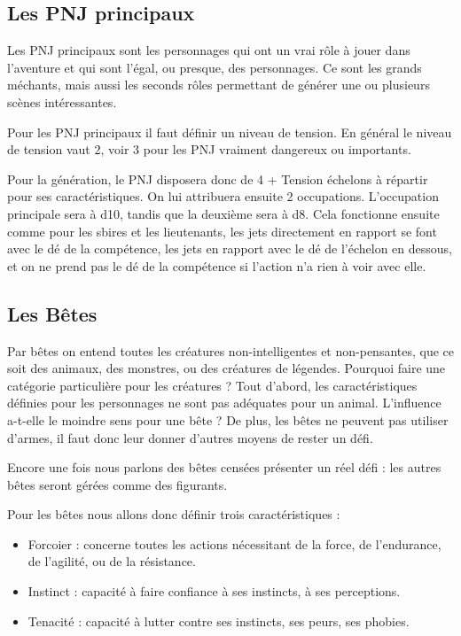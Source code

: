 \subsection{Les PNJ principaux}

Les PNJ principaux sont les personnages qui ont un vrai rôle à jouer dans l'aventure et qui sont l'égal, ou presque, des personnages. Ce sont les grands méchants, mais aussi les seconds rôles permettant de générer une ou plusieurs scènes intéressantes.

Pour les PNJ principaux il faut définir un niveau de tension. En général le niveau de tension vaut 2, voir 3 pour les PNJ vraiment dangereux ou importants. 

Pour la génération, le PNJ disposera donc de 4 + Tension échelons à répartir pour ses caractéristiques. On lui attribuera ensuite 2 occupations. L'occupation principale sera à d10, tandis que la deuxième sera à d8. Cela fonctionne ensuite comme pour les sbires et les lieutenants, les jets directement en rapport se font avec le dé de la compétence, les jets en rapport avec le dé de l'échelon en dessous, et on ne prend pas le dé de la compétence si l'action n'a rien à voir avec elle.

\subsection{Les Bêtes}

Par bêtes on entend toutes les créatures non-intelligentes et non-pensantes, que ce soit des animaux, des monstres, ou des créatures de légendes. Pourquoi faire une catégorie particulière pour les créatures ? Tout d'abord, les caractéristiques définies pour les personnages ne sont pas adéquates pour un animal. L'influence a-t-elle le moindre sens pour une bête ? De plus, les bêtes ne peuvent pas utiliser d'armes, il faut donc leur donner d'autres moyens de rester un défi.

Encore une fois nous parlons des bêtes censées présenter un réel défi : les autres bêtes seront gérées comme des figurants. 

Pour les bêtes nous allons donc définir trois caractéristiques :

\begin{itemize}
\item Forcoier : concerne toutes les actions nécessitant de la force, de l'endurance, de l'agilité, ou de la résistance.
\item Instinct : capacité à faire confiance à ses instincts, à ses perceptions.
\item Tenacité : capacité à lutter contre ses instincts, ses peurs, ses phobies. 
\end{itemize}

